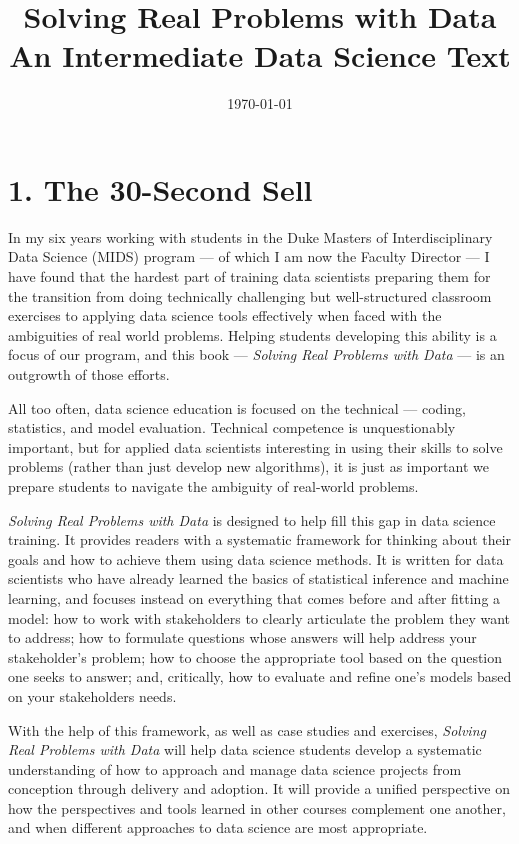 \documentclass[12pt]{article}
\title{Solving Real Problems with Data \\ An Intermediate Data Science Text}
\begin{document}
\setlength{\parindent}{0.0in}
\setlength{\parskip}{.125in}


\date{\today }


\maketitle
\section*{1. The 30-Second Sell}\label{the-30-second-sell}

In my six years working with students in the Duke Masters of
Interdisciplinary Data Science (MIDS) program --- of which I am now the
Faculty Director --- I have found that the hardest part of training data
scientists preparing them for the transition from doing technically
challenging but well-structured classroom exercises to applying data
science tools effectively when faced with the ambiguities of real world
problems. Helping students developing this ability is a focus of our
program, and this book --- \emph{Solving Real Problems with Data} --- is
an outgrowth of those efforts.

All too often, data science education is focused on the technical ---
coding, statistics, and model evaluation. Technical competence is
unquestionably important, but for applied data scientists interesting in
using their skills to solve problems (rather than just develop new
algorithms), it is just as important we prepare students to navigate the
ambiguity of real-world problems.

\emph{Solving Real Problems with Data} is designed to help fill this gap
in data science training. It provides readers with a systematic
framework for thinking about their goals and how to achieve them using
data science methods. It is written for data scientists who have already
learned the basics of statistical inference and machine learning, and
focuses instead on everything that comes before and after fitting a
model: how to work with stakeholders to clearly articulate the problem
they want to address; how to formulate questions whose answers will help
address your stakeholder's problem; how to choose the appropriate tool
based on the question one seeks to answer; and, critically, how to
evaluate and refine one's models based on your stakeholders needs.

With the help of this framework, as well as case studies and exercises,
\emph{Solving Real Problems with Data} will help data science students
develop a systematic understanding of how to approach and manage data
science projects from conception through delivery and adoption. It will
provide a unified perspective on how the perspectives and tools learned
in other courses complement one another, and when different approaches
to data science are most appropriate.
\end{document}
